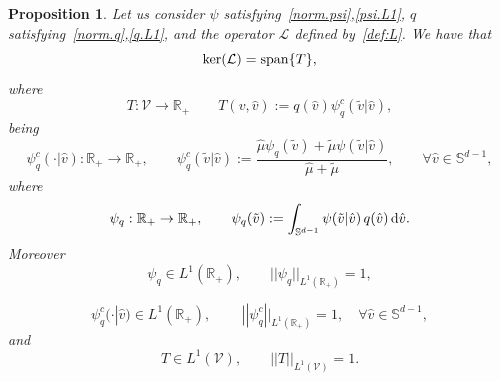 \documentclass[a4paper]{article}
\theoremstyle{Theorem}\newtheorem{proposition}{Proposition}[section]
\theoremstyle{Remark}\newtheorem{remark}{Remark}[section]
\theoremstyle{Theorem}\newtheorem{theorem}{Theorem}[section]
\newcommand{\R}{\mathbb{R}}
\newcommand{\hv}{\hat{v}}
\newcommand{\tv}{\tilde{v}}
\newcommand{\hmu}{\hat{\mu}}
\newcommand{\tmu}{\tilde{\mu}}
\newcommand{\intS}{\int_{\mathbb{S}^{d-1}}}
\begin{document}
\begin{proposition}\label{prop.1}
Let us consider $\psi$ satisfying~\eqref{norm.psi},\eqref{psi.L1}, $q$ satisfying~\eqref{norm.q},\eqref{q.L1}, and the operator $\mathcal{L}$ defined by~\eqref{def:L}. We have that
\[
\ker(\mathcal{L})= {\rm span}\lbrace T\rbrace,
\]
where
\begin{equation}\label{def:T}
    T: \mathcal{V}\to \R_+ \qquad T(v,\hv):= q(\hv) \psi_q^c(\tv|\hv),
\end{equation}
being
\begin{equation}\label{def:psiqc}
    \psi_q^c(\cdot|\hv):\R_+ \to\R_+, \qquad \psi_q^c(\tv|\hv) := \dfrac{\hmu \psi_q(\tv)+\tmu\psi(\tv|\hv)}{\hmu+\tmu}, \qquad \forall \hv \in \mathbb{S}^{d-1},
\end{equation}
where
\begin{equation*}\label{def:psiq}
    \psi_q:\R_+\to \R_+, \qquad \psi_q(\tv):=\intS \psi(\tv|\hv) \, q(\hv) \, {\rm d} \hv.
\end{equation*}
Moreover
\begin{equation}\label{norm.psiq}
\psi_q \in L^1(\R_+), \qquad ||\psi_q||_{L^1(\R_+)}=1,    
\end{equation}

\begin{equation}\label{norm.psiqc}
 \psi_q^c(\cdot| \hv) \in L^1(\R_+), \,  \qquad ||\psi_q^c||_{L^1(\R_+)}=1, \quad \forall \hv \in \mathbb{S}^{d-1},
\end{equation}
and
\begin{equation}\label{norm.T}
T\in L^1(\mathcal{V}), \qquad ||T||_{L^1(\mathcal{V})}=1.    
\end{equation}
\end{proposition}
\end{document}
